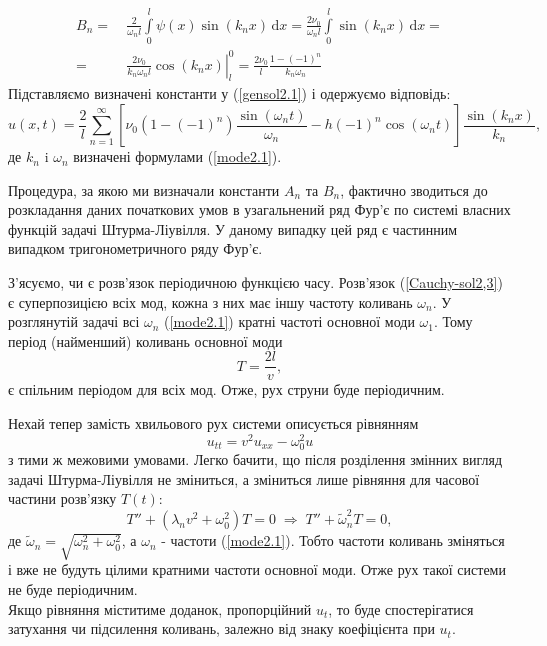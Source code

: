 \begin{equation*}
    \begin{aligned}
        B_n =&\ \frac{2}{\omega_n l} \int\limits_0^l \psi(x) \sin(k_n x) \,\mathrm{d}x = \frac{2\nu_0}{\omega_n l} \int\limits_0^l \sin(k_n x) \,\mathrm{d}x =\\
        =&\ \left.\frac{2\nu_0}{k_n\omega_n l} \cos(k_n x)\right|_l^0 = \frac{2\nu_0}{l} \frac{1 - (-1)^n}{k_n\omega_n}
    \end{aligned}
\end{equation*}
Підставляємо визначені константи у (\ref{gensol2.1}) і одержуємо відповідь:
\begin{equation} \label{Cauchy-sol2,3}
    u(x,t) = \frac{2}{l}\sum^{\infty}_{n=1} \left[\nu_0 (1 - (-1)^n)\frac{\sin(\omega_n t)}{\omega_n} - h(-1)^n\cos(\omega_n t)\right] \frac{\sin(k_n x)}{k_n},
\end{equation}
де $k_n$ i $\omega_n$ визначені формулами (\ref{mode2.1}).

Процедура, за якою ми визначали константи $A_n$ та $B_n$, фактично зводиться до розкладання даних початкових умов в узагальнений ряд Фур'є по системі власних функцій задачі Штурма-Ліувілля. У даному випадку цей ряд є частинним випадком тригонометричного ряду Фур'є. 

З'ясуємо, чи є розв'язок періодичною функцією часу. Розв'язок (\ref{Cauchy-sol2,3}) є суперпозицією всіх мод, кожна з них має іншу частоту коливань $\omega_n$. У розглянутій задачі  всі $\omega_n$ (\ref{mode2.1}) кратні частоті основної моди $\omega_1$. Тому період (найменший) коливань основної моди \[T = \frac{2l}{v},\] є спільним періодом для всіх мод. Отже, рух струни буде періодичним. 

Нехай тепер замість хвильового рух системи описується рівнянням \[u_{tt} = v^2 u_{xx} - \omega_0^2 u\] з тими ж межовими умовами. Легко бачити, що після розділення змінних вигляд задачі Штурма-Ліувілля не зміниться, а зміниться лише рівняння для часової частини розв'язку $T(t)$:
\begin{equation}
    T'' + (\lambda_n v^2 + \omega_0^2) T = 0
    \;\Rightarrow\; 
    T'' + \widetilde{\omega}_n^2 T = 0,
\end{equation}
де $\widetilde{\omega}_n = \sqrt{\omega_n^2 + \omega_0^2}$, а $\omega_n$ - частоти (\ref{mode2.1}). Тобто частоти коливань зміняться і вже не будуть цілими кратними частоти основної моди. Отже рух такої системи не буде періодичним.\\
Якщо рівняння міститиме доданок, пропорційний $u_t$, то буде спостерігатися затухання чи підсилення коливань, залежно від знаку коефіцієнта при $u_t$.

%